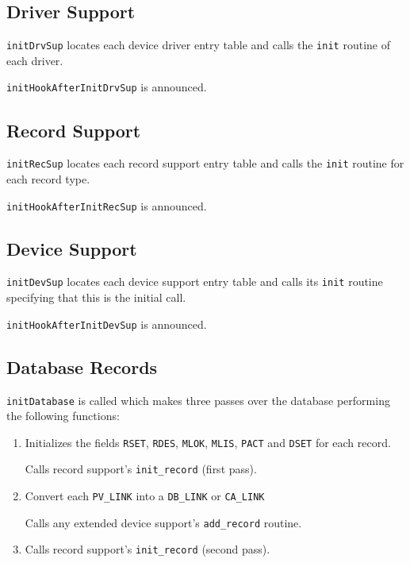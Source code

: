 \subsection{Driver Support}

\verb|initDrvSup| locates each device driver entry table and calls the \verb|init| routine of each driver.

\verb|initHookAfterInitDrvSup| is announced.

\subsection{Record Support}

\verb|initRecSup| locates each record support entry table and calls the \verb|init| routine for each record type.

\verb|initHookAfterInitRecSup| is announced.

\subsection{Device Support}

\verb|initDevSup| locates each device support entry table and calls its \verb|init| routine specifying that this is the initial call.

\verb|initHookAfterInitDevSup| is announced.

\subsection{Database Records}

\verb|initDatabase| is called which makes three passes over the database performing the following functions:

\begin{enumerate}

\item Initializes the fields \verb|RSET|, \verb|RDES|, \verb|MLOK|, \verb|MLIS|, \verb|PACT| and \verb|DSET| for each record.

Calls record support's \verb|init_record| (first pass).

\item Convert each \verb|PV_LINK| into a \verb|DB_LINK| or \verb|CA_LINK|

Calls any extended device support's \verb|add_record| routine.

\item Calls record support's \verb|init_record| (second pass).

\end{enumerate}


